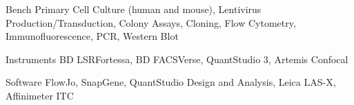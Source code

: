 

\begin{cvskills}

  \cvskill
    {Bench} %
    {Primary Cell Culture (human and mouse), Lentivirus Production/Transduction, Colony Assays, Cloning, Flow Cytometry, Immunofluorescence, PCR, Western Blot} %

  \cvskill
    {Instruments} %
    {BD LSRFortessa, BD FACSVerse, QuantStudio 3, Artemis Confocal} %

\cvskill
    {Software} %
    {FlowJo, SnapGene, QuantStudio Design and Analysis, Leica LAS-X, Affinimeter ITC} %

 
\end{cvskills}
